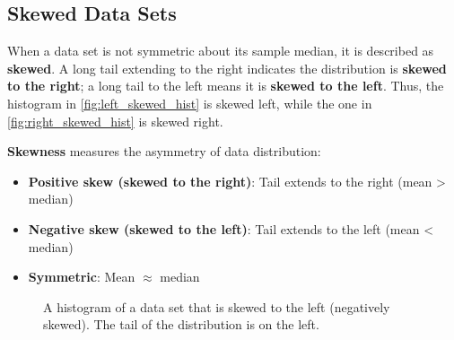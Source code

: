 \subsection*{Skewed Data Sets}
When a data set is not symmetric about its sample median, it is described as \textbf{skewed}. A long tail extending to the right indicates the distribution is \textbf{skewed to the right}; a long tail to the left means it is \textbf{skewed to the left}. Thus, the histogram in \autoref{fig:left_skewed_hist} is skewed left, while the one in \autoref{fig:right_skewed_hist} is skewed right.

\begin{definition}[Skewness]
    \textbf{Skewness} measures the asymmetry of data distribution:
    \begin{itemize}
        \item \textbf{Positive skew (skewed to the right)}: Tail extends to the right (mean > median)
        \item \textbf{Negative skew (skewed to the left)}: Tail extends to the left (mean < median)
        \item \textbf{Symmetric}: Mean $\approx$ median
    \end{itemize}
    \end{definition}

\begin{figure}[htbp]
    \centering
    \caption{A histogram of a data set that is skewed to the left (negatively skewed). The tail of the distribution is on the left.}
    \label{fig:left_skewed_hist}
\end{figure}

